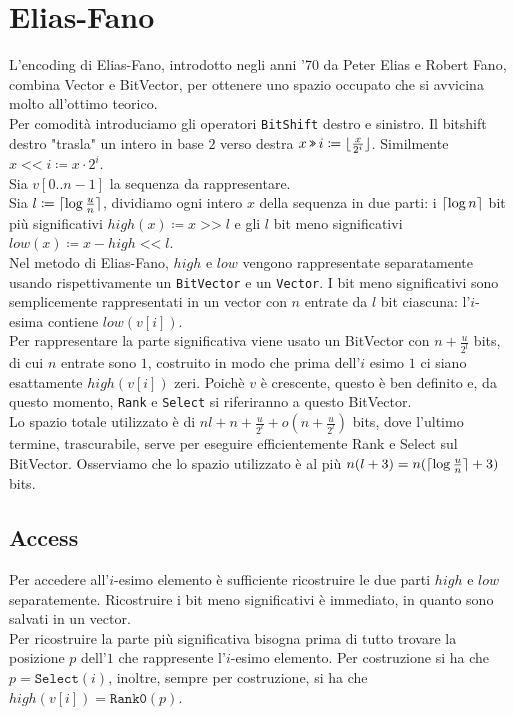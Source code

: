 \documentclass{article}
\DeclarePairedDelimiter\ceil{\lceil}{\rceil}
\DeclarePairedDelimiter\floor{\lfloor}{\rfloor}
\newcommand{\ttt}{\texttt}
\newcommand{\clg}[1]{\ensuremath \ceil{\log #1}}
\DeclareMathOperator\Lshift{\ttt{<<}}
\DeclareMathOperator\Rshift{\ttt{>>}}
\begin{document}
\section{Elias-Fano}
L'encoding di Elias-Fano, introdotto negli anni '70 da Peter Elias\cite{10.1145/321812.321820} e Robert Fano\cite{fano1971number}, combina Vector e BitVector, per ottenere uno spazio occupato che si avvicina molto all'ottimo teorico.\\
Per comodit\`a introduciamo gli operatori \ttt{BitShift} destro e sinistro. Il bitshift destro "trasla" un intero in base $2$ verso destra $x \Rshift i \coloneq \floor{\frac{x}{2^i}}$. Similmente $x \Lshift i \coloneq x \cdot 2^i$.\\
Sia $v[0..n-1]$ la sequenza da rappresentare.\\
Sia $l \coloneq \clg{\frac{u}{n}}$, dividiamo ogni intero $x$ della sequenza in due parti: i $\clg{n}$ bit pi\`u significativi $high(x) \coloneq x \Rshift l$ e gli $l$ bit meno significativi $low(x) \coloneq x - high \Lshift l$.\\
Nel metodo di Elias-Fano, $high$ e $low$ vengono rappresentate separatamente usando rispettivamente un \ttt{BitVector} e un \ttt{Vector}. I bit meno significativi sono semplicemente rappresentati in un vector con $n$ entrate da $l$ bit ciascuna: l'$i$-esima contiene $low(v[i])$.\\
Per rappresentare la parte significativa viene usato un BitVector con $n + \frac{u}{2^l}$ bits, di cui $n$ entrate sono $1$, costruito in modo che prima dell'$i$ esimo $1$ ci siano esattamente $high(v[i])$ zeri.
Poich\`e $v$ \`e crescente, questo \`e ben definito e, da questo momento, \ttt{Rank} e \ttt{Select} si riferiranno a questo BitVector.\\
Lo spazio totale utilizzato \`e di $n l + n + \frac{u}{2^l} + o(n + \frac{u}{2^l})$ bits, dove l'ultimo termine, trascurabile, serve per eseguire efficientemente Rank e Select sul BitVector. Osserviamo che lo spazio utilizzato \`e al pi\`u $n (l + 3) = n (\clg{\frac{u}{n}} + 3)$ bits.

\subsection{Access}
Per accedere all'$i$-esimo elemento \`e sufficiente ricostruire le due parti $high$ e $low$ separatemente. Ricostruire i bit meno significativi \`e immediato, in quanto sono salvati in un vector.\\
Per ricostruire la parte pi\`u significativa bisogna prima di tutto trovare la posizione $p$ dell'$1$ che rappresente l'$i$-esimo elemento. Per costruzione si ha che $p = \ttt{Select}(i)$, inoltre, sempre per costruzione, si ha che $high(v[i]) = \ttt{Rank0}(p)$.
\end{document}
